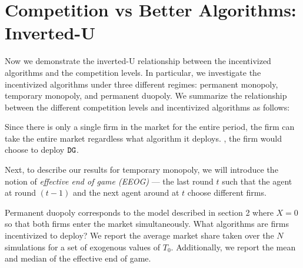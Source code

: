 \documentclass[../competing_bandits.tex]{subfiles}
\begin{document}
\section{Competition vs Better Algorithms: Inverted-U}\label{section:5}
 Now we demonstrate the inverted-U relationship between the incentivized
  algorithms and the competition levels. In particular, we investigate
  the incentivized algorithms under three different regimes: permanent
  monopoly, temporary monopoly, and permanent duopoly.  
 We summarize the relationship between the different competition levels and incentivized algorithms as follows:
  
  

 Since there is only a single firm
  in the market for the entire period, the firm can take the entire
  market regardless what algorithm it deploys.  , the firm would choose to deploy $\mathtt{DG}$.

Next, to describe our results for temporary monopoly, we will
introduce the notion of \textit{effective end of game (EEOG)} --- the
last round $t$ such that the agent at round $(t-1)$ and the next agent
around at $t$ choose different firms.

 Permanent duopoly corresponds to the model described in section 2 where $X = 0$ so that both firms enter the market simultaneously. What algorithms are firms incentivized to deploy? We report the average market share taken over the $N$ simulations for a set of exogenous values of $T_0$. Additionally, we report the mean and median of the effective end of game.
\end{document}
